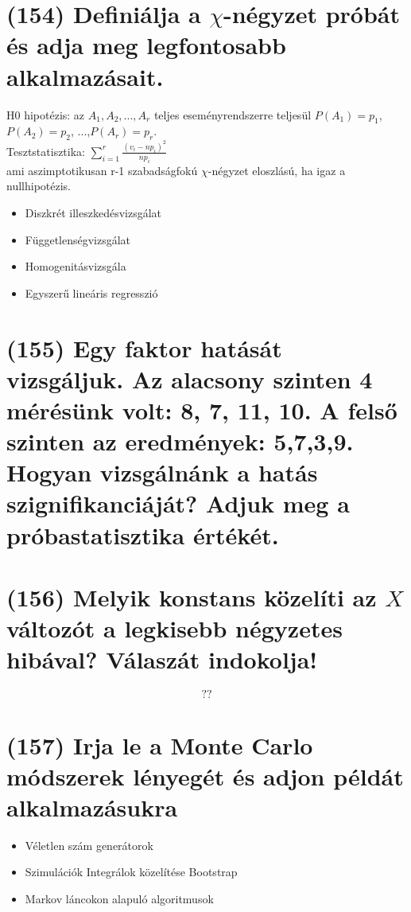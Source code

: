 \documentclass[12p]{article}
\begin{document}
\section{(154) Definiálja a $\chi$-négyzet próbát és adja meg legfontosabb alkalmazásait.}

H0 hipotézis: az $A_1, A_2, ..., A_r$ teljes eseményrendszerre teljesül $P(A_1)=p_1$, $P(A_2)=p_2$, ...,$P(A_r)=p_r$.\\
Tesztstatisztika: $\displaystyle{ \sum^r_{i=1} \frac{(v_i - np_i)^2}{np_i}}$\\
ami aszimptotikusan r-1 szabadságfokú $\chi$-négyzet eloszlású, ha igaz a nullhipotézis. 

\begin{itemize}
	\item Diszkrét illeszkedésvizsgálat
	\item Függetlenségvizsgálat
	\item Homogenitásvizsgála
	\item Egyszerű lineáris regresszió
\end{itemize}

\section{(155) Egy faktor hatását vizsgáljuk. Az alacsony szinten 4 mérésünk volt: 8, 7, 11, 10. A felső
szinten az eredmények: 5,7,3,9. Hogyan vizsgálnánk a hatás szignifikanciáját? Adjuk meg
a próbastatisztika értékét.}

\section{(156) Melyik konstans közelíti az $X$ változót a legkisebb négyzetes hibával? Válaszát indokolja!}

$$??$$

\section{(157)  Irja le a Monte Carlo módszerek lényegét és adjon példát alkalmazásukra}

\begin{itemize}
	\item Véletlen szám generátorok
	\item Szimulációk
	\subitem Integrálok közelítése
	\subitem Bootstrap
	\item Markov láncokon alapuló algoritmusok
\end{itemize}
\end{document}
